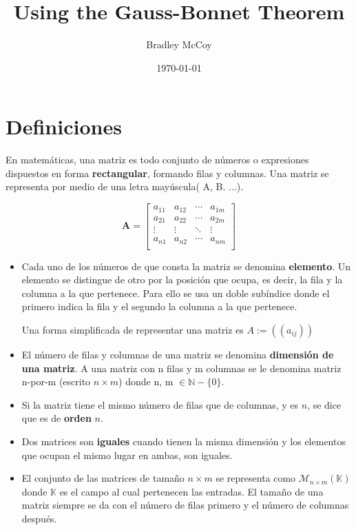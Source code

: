 \documentclass[10pt]{article}
\title{Using the Gauss-Bonnet Theorem}
\author{Bradley McCoy}
\date{\today}
\begin{document}
\maketitle \tableofcontents 



\section{Definiciones}
En matemáticas, una matriz es todo conjunto de números o expresiones dispuestos en forma \textbf{rectangular}, formando filas y columnas. Una matriz se representa por medio de una letra mayúscula( A, B. ...).

\begin{equation}
\textbf{A} = \left[
\begin{array}{cccc}
a_{11} & a_{12} & \cdots & a_{1m} \\
a_{21} & a_{22} & \cdots & a_{2m} \\
\vdots & \vdots & \ddots & \vdots \\
a_{n1} & a_{n2} & \cdots & a_{nm} \\
\end{array}
\right]
\end{equation}

\begin{itemize}
 \item Cada uno de los números de que consta la matriz se denomina \textbf{elemento}. Un elemento se distingue de otro por la posición que ocupa, es decir, la fila y la columna a la que pertenece. Para ello se usa un doble subíndice donde el primero indica la fila y el segundo la columna a la que pertenece.
 
 Una forma simplificada de representar una matriz es $A:= ((a_{ij}))$
 \item El número de filas y columnas de una matriz se denomina \textbf{dimensión de una matriz}. A una matriz con n filas y m columnas se le denomina matriz n-por-m (escrito $n\times{m}$) donde n, m $\in{\mathbb{N}} - \{0\}$.
 \item Si la matriz tiene el mismo número de filas que de columnas, y es $n$, se dice que es de \textbf{orden} $n$.
 \item Dos matrices son \textbf{iguales} cuando tienen la misma dimensión y los elementos que ocupan el mismo lugar en ambas, son iguales.
 \item El conjunto de las matrices de tamaño $n \times{m}$ se representa como $\mathcal{M}_{n\times {m}}(\mathbb{K})$ donde $\mathbb{K}$ es el campo al cual pertenecen las entradas. El tamaño de una matriz siempre se da con el número de filas primero y el número de columnas después.
 \end {itemize}
 
\end{document}
